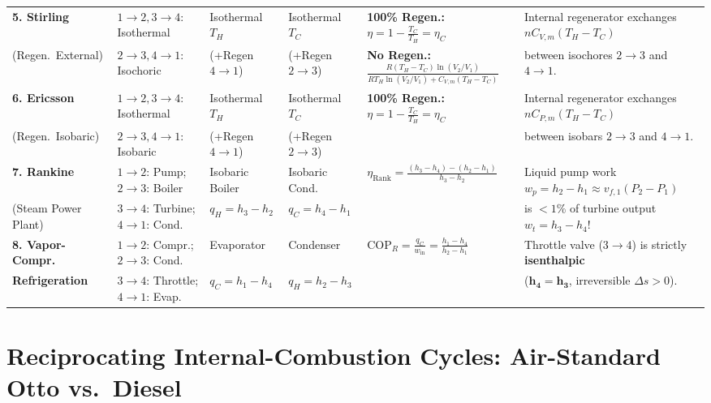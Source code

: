 \begin{table}[!htbp]
\begin{tabularx}{\linewidth}{@{}l l l l l X@{}}
\textbf{5. Stirling} & $1\to 2, 3\to 4$: Isothermal & Isothermal $T_H$ & Isothermal $T_C$ & \textbf{100\% Regen.:} $\displaystyle \eta = 1 - \frac{T_C}{T_H} = \eta_C$ & Internal regenerator exchanges $nC_{V,m}(T_H-T_C)$ \\
(Regen.\ External) & $2\to 3, 4\to 1$: Isochoric & (+Regen $4\to 1$) & (+Regen $2\to 3$) & \textbf{No Regen.:} $\frac{R(T_H-T_C)\ln(V_2/V_1)}{RT_H\ln(V_2/V_1)+C_{V,m}(T_H-T_C)}$ & between isochores $2\to 3$ and $4\to 1$. \\[3pt]
\textbf{6. Ericsson} & $1\to 2, 3\to 4$: Isothermal & Isothermal $T_H$ & Isothermal $T_C$ & \textbf{100\% Regen.:} $\displaystyle \eta = 1 - \frac{T_C}{T_H} = \eta_C$ & Internal regenerator exchanges $nC_{P,m}(T_H-T_C)$ \\
(Regen.\ Isobaric) & $2\to 3, 4\to 1$: Isobaric & (+Regen $4\to 1$) & (+Regen $2\to 3$) & & between isobars $2\to 3$ and $4\to 1$. \\[3pt]
\textbf{7. Rankine} & $1\to 2$: Pump; $2\to 3$: Boiler & Isobaric Boiler & Isobaric Cond. & $\displaystyle \eta_{\mathrm{Rank}} = \frac{(h_3 - h_4) - (h_2 - h_1)}{h_3 - h_2}$ & Liquid pump work $w_p = h_2-h_1 \approx v_{f,1}(P_2-P_1)$ \\
(Steam Power Plant) & $3\to 4$: Turbine; $4\to 1$: Cond. & $q_H = h_3 - h_2$ & $q_C = h_4 - h_1$ & & is $<1\%$ of turbine output $w_t = h_3 - h_4$! \\[3pt]
\textbf{8. Vapor-Compr.} & $1\to 2$: Compr.; $2\to 3$: Cond. & Evaporator & Condenser & $\displaystyle \mathrm{COP}_R = \frac{q_C}{w_{\mathrm{in}}} = \frac{h_1 - h_4}{h_2 - h_1}$ & Throttle valve ($3\to 4$) is strictly \textbf{isenthalpic} \\
\textbf{Refrigeration} & $3\to 4$: Throttle; $4\to 1$: Evap. & $q_C = h_1 - h_4$ & $q_H = h_2 - h_3$ & & ($\mathbf{h_4 = h_3}$, irreversible $\Delta s > 0$). \\
\bottomrule
\end{tabularx}
\end{table}

\section{Reciprocating Internal-Combustion Cycles: Air-Standard Otto vs.\ Diesel}\label{sec:09.4}


